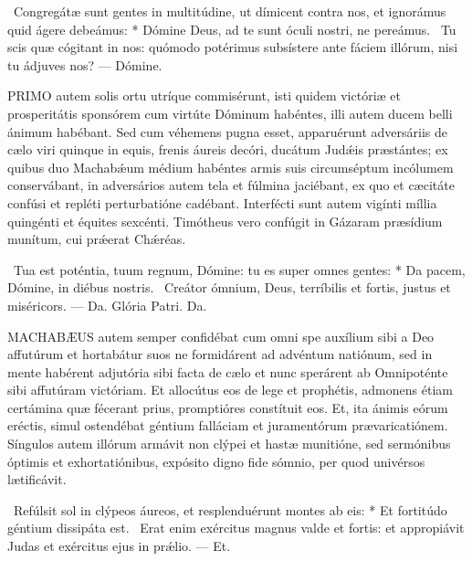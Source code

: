 \R\ Congregátæ sunt gentes in multitúdine, ut dímicent contra nos, et ignorámus quid ágere debeámus: * Dómine Deus, ad te sunt óculi nostri, ne pereámus. \V\ Tu scis quæ cógitant in nos: quómodo potérimus subsístere ante fáciem illórum, nisi tu ádjuves nos? — Dómine.



\lettrine[lines=2]{P}{RIMO} autem solis ortu utríque commisérunt, isti quidem victóriæ et prosperitátis sponsórem cum virtúte Dóminum habéntes, illi autem ducem belli ánimum habébant. Sed cum véhemens pugna esset, apparuérunt adversáriis de cælo viri quinque in equis, frenis áureis decóri, ducátum Judǽis præstántes; ex quibus duo Machabǽum médium habéntes armis suis circumséptum incólumem conservábant, in adversários autem tela et fúlmina jaciébant, ex quo et cæcitáte confúsi et repléti perturbatióne cadébant. Interfécti sunt autem vigínti míllia quingénti et équites sexcénti. Timótheus vero confúgit in Gázaram præsídium munítum, cui prǽerat Chǽréas.

\R\ Tua est poténtia, tuum regnum, Dómine: tu es super omnes gentes: * Da pacem, Dómine, in diébus nostris. \V\ Creátor ómnium, Deus, terríbilis et fortis, justus et miséricors. — Da. Glória Patri. Da.




\lettrine[lines=2]{M}{ACHABÆUS} autem semper confidébat cum omni spe auxílium sibi a Deo affutúrum et hortabátur suos ne formidárent ad advéntum natiónum, sed in mente habérent adjutória sibi facta de cælo et nunc sperárent ab Omnipoténte sibi affutúram victóriam. Et allocútus eos de lege et prophétis, admonens étiam certámina quæ fécerant prius, promptióres constítuit eos. Et, ita ánimis eórum eréctis, simul ostendébat géntium falláciam et juramentórum prævaricatiónem. Síngulos autem illórum armávit non clýpei et hastæ munitióne, sed sermónibus óptimis et exhortatiónibus, expósito digno fide sómnio, per quod univérsos lætificávit.

\R\ Refúlsit sol in clýpeos áureos, et resplenduérunt montes ab eis: * Et fortitúdo géntium dissipáta est. \V\ Erat enim exércitus magnus valde et fortis: et appropiávit Judas et exércitus ejus in prǽlio. — Et.

